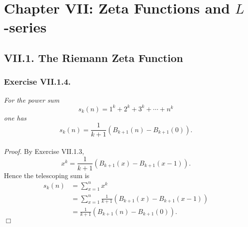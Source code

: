 \documentclass{article}
\begin{document}



\newpage
\section*{Chapter VII: Zeta Functions and $L$-series \\}



\subsection*{VII.1. The Riemann Zeta Function \\}



\subsubsection*{Exercise VII.1.4.}
\emph{For the power sum
\[
  s_k(n) = 1^k + 2^k + 3^k + \cdots + n^k
\]
one has}
\[
  s_k(n) = \frac{1}{k+1} (B_{k+1}(n) - B_{k+1}(0)).
\] \\



\emph{Proof.}
  By Exercise VII.1.3,
  \[
    x^k = \frac{1}{k+1} (B_{k+1}(x) - B_{k+1}(x-1)).
  \]
  Hence the telescoping sum is
  \begin{align*}
     s_k(n)
     &= \sum_{x=1}^{n} x^k \\
     &= \sum_{x=1}^{n} \frac{1}{k+1} (B_{k+1}(x) - B_{k+1}(x-1)) \\
     &= \frac{1}{k+1} (B_{k+1}(n) - B_{k+1}(0)).
  \end{align*}
$\Box$ \\\\



\end{document}
